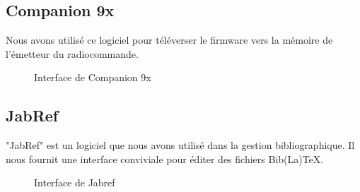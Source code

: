 	\subsection{Companion 9x}
	Nous avons utilisé ce logiciel pour téléverser le firmware vers la mémoire de l'émetteur du radiocommande.
	\begin{figure}[H]
		\begin{center}
			\centering
			\vskip 1cm
		\end{center}
		\caption{Interface de Companion 9x}
	\end{figure}
	
	\subsection{JabRef}
	"JabRef" est un logiciel que nous avons utilisé dans la gestion bibliographique. Il nous fournit une interface conviviale pour éditer des fichiers Bib(La)TeX.
	\begin{figure}[H]
		\begin{center}
			\centering
			\vskip 1cm
		\end{center}
		\caption{Interface de Jabref}
	\end{figure}
	\vskip 1cm
